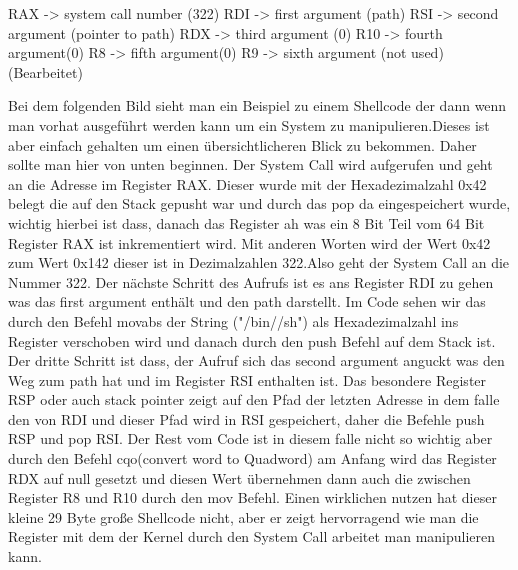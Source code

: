 


RAX -> system call number (322)
RDI -> first argument (path)
RSI -> second argument (pointer to path)
RDX -> third argument (0)
R10 -> fourth argument(0)
R8 -> fifth argument(0)
R9 -> sixth argument (not used) (Bearbeitet)


Bei dem folgenden Bild sieht man ein Beispiel zu einem Shellcode der dann wenn man
vorhat ausgeführt werden kann um ein System zu manipulieren.Dieses ist aber einfach
gehalten um einen übersichtlicheren Blick zu bekommen. Daher sollte man hier von unten
beginnen. Der System Call wird aufgerufen und geht an die Adresse im Register RAX.
Dieser wurde mit der Hexadezimalzahl 0x42 belegt die auf den Stack gepusht
war und durch das pop da eingespeichert wurde, wichtig hierbei ist dass,
danach das Register ah was ein 8 Bit Teil vom 64 Bit Register RAX ist inkrementiert wird.
Mit anderen Worten wird der Wert 0x42 zum Wert 0x142 dieser ist in
Dezimalzahlen 322.Also geht der  System Call an die Nummer 322.
Der nächste Schritt des Aufrufs ist es ans Register RDI zu gehen was das first
argument enthält und den path darstellt. Im Code sehen wir das durch den
Befehl movabs der String ("/bin//sh") als Hexadezimalzahl ins Register
verschoben wird und danach durch den push Befehl auf dem Stack ist.
Der dritte Schritt ist dass, der Aufruf sich das second argument anguckt
was den Weg zum path hat und im Register RSI enthalten ist. Das besondere
Register RSP oder auch stack pointer zeigt auf den Pfad der letzten Adresse
in dem falle den von RDI und dieser Pfad wird in RSI gespeichert, daher die
Befehle push RSP und pop RSI. Der Rest vom Code ist in diesem falle nicht so
wichtig aber durch den Befehl cqo(convert word to Quadword) am Anfang wird das
Register RDX auf null gesetzt und diesen Wert übernehmen dann auch die zwischen
Register R8 und R10 durch den mov Befehl. Einen wirklichen nutzen hat dieser
kleine 29 Byte große
Shellcode nicht, aber er zeigt hervorragend wie man die Register mit dem der
Kernel durch den System Call arbeitet man manipulieren kann. \cite{shellstorm}
